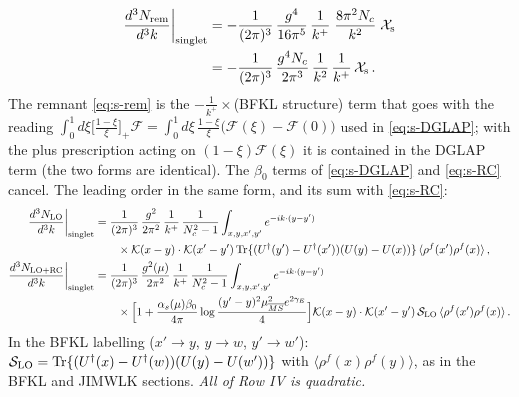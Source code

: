 \documentclass[9pt]{article}
\numberwithin{equation}{section}
\begin{document}
{\begin{align}
\frac{d^{3}N_{\rm rem}}{d^{3}k}\bigg|_{\rm singlet}&=-\frac{1}{(2\pi)^{3}}\,\frac{g^{4}}{16\pi^{5}}\,\frac{1}{k^{+}}\;\frac{8\pi^{2}N_{c}}{k^{2}}\;\mathcal{X}_{\rm s}\notag\\&=-\frac{1}{(2\pi)^{3}}\,\frac{g^{4}N_{c}}{2\pi^{3}}\,\frac{1}{k^{2}}\,\frac{1}{k^{+}}\,\mathcal{X}_{\rm s}\,.\label{eq:s-rem}
\end{align}
The remnant \eqref{eq:s-rem} is the $-\frac{1}{k^{+}}\times$(BFKL structure) term that goes with the reading $\int_{0}^{1}d\xi\big[\frac{1-\xi}{\xi}\big]_{+}\mathcal{F}=\int_{0}^{1}d\xi\,\frac{1-\xi}{\xi}\big(\mathcal{F}(\xi)-\mathcal{F}(0)\big)$ used in \eqref{eq:s-DGLAP}; with the plus prescription acting on $(1-\xi)\mathcal{F}(\xi)$ it is contained in the DGLAP term (the two forms are identical). The $\beta_{0}$ terms of \eqref{eq:s-DGLAP} and \eqref{eq:s-RC} cancel. The leading order in the same form, and its sum with \eqref{eq:s-RC}:
\begin{align}
\frac{d^{3}N_{\rm LO}}{d^{3}k}\bigg|_{\rm singlet}&=\frac{1}{(2\pi)^{3}}\,\frac{g^{2}}{2\pi^{2}}\,\frac{1}{k^{+}}\,\frac{1}{N_{c}^{2}-1}\int_{x,y,x',y'}e^{-ik\cdot(y-y')}\notag\\&\qquad\times\mathcal{K}(x-y)\cdot\mathcal{K}(x'-y')\,{\rm Tr}\{(U^{\dagger}(y')-U^{\dagger}(x'))(U(y)-U(x))\}\,\langle\rho^{f}(x')\rho^{f}(x)\rangle\,,\label{eq:s-LO}\\
\frac{d^{3}N_{\rm LO+RC}}{d^{3}k}\bigg|_{\rm singlet}&=\frac{1}{(2\pi)^{3}}\,\frac{g^{2}(\mu)}{2\pi^{2}}\,\frac{1}{k^{+}}\,\frac{1}{N_{c}^{2}-1}\int_{x,y,x',y'}e^{-ik\cdot(y-y')}\notag\\&\qquad\times\Big[1+\frac{\alpha_{s}(\mu)\beta_{0}}{4\pi}\log\frac{(y'-y)^{2}\mu^{2}_{\overline{MS}}e^{2\gamma_{E}}}{4}\Big]\mathcal{K}(x-y)\cdot\mathcal{K}(x'-y')\,\mathcal{S}_{\rm LO}\,\langle\rho^{f}(x')\rho^{f}(x)\rangle\,.\notag
\end{align}
In the BFKL labelling ($x'\to y$, $y\to w$, $y'\to w'$): $\mathcal{S}_{\rm LO}={\rm Tr}\{(U^{\dagger}(x)-U^{\dagger}(w))(U(y)-U(w'))\}$ with $\langle\rho^{f}(x)\rho^{f}(y)\rangle$, as in the BFKL and JIMWLK sections. \emph{All of Row IV is quadratic.}

}
\end{document}

